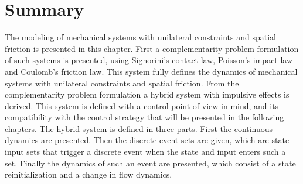 \documentclass[../DC2017114Bouma.tex]{subfiles}
\begin{document}
\section{Summary}
The modeling of mechanical systems with unilateral constraints and spatial friction is presented in this chapter. First a complementarity problem formulation of such systems is presented, using Signorini's contact law, Poisson's impact law and Coulomb's friction law. This system fully defines the dynamics of mechanical systems with unilateral constraints and spatial friction. From the complementarity problem formulation a hybrid system with impulsive effects is derived. This system is defined with a control point-of-view in mind, and its compatibility with the control strategy that will be presented in the following chapters. The hybrid system is defined in three parts. First the continuous dynamics are presented. Then the discrete event sets are given, which are state-input sets that trigger a discrete event when the state and input enters such a set. Finally the dynamics of such an event are presented, which consist of a state reinitialization and a change in flow dynamics.
\end{document}
